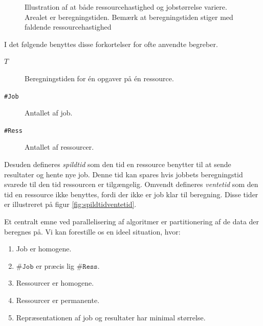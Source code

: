 \documentclass[final,a4paper,11pt]{article}
\begin{document}
\begin{figure}[!h]
\begin{center}

\caption{Illustration af at både ressourcehastighed og jobstørrelse variere. Arealet er beregningstiden. Bemærk at beregningstiden stiger med faldende ressourcehastighed}\label{fig:lillekassestorkasse} 
\end{center}
\end{figure}


I det følgende benyttes disse forkortelser for ofte anvendte begreber.
\begin{description}
	\item[$T$] Beregningstiden for én opgaver på én ressource.  
	\item[\texttt{\#Job}] Antallet af job.
	\item[\texttt{\#Ress}] Antallet af ressourcer.  
\end{description}

Desuden defineres \emph{spildtid} som den tid en ressource benytter til at sende resultater og hente nye job. Denne tid kan spares hvis jobbets beregningstid svarede til den tid ressourcen er tilgængelig. Omvendt defineres \emph{ventetid} som den tid en ressource ikke benyttes, fordi der ikke er job klar til beregning. Disse tider er illustreret på figur \ref{fig:spildtidventetid}.

Et centralt emne ved parallelisering af algoritmer er partitionering af de data der beregnes på. Vi kan forestille os en ideel situation, hvor:
\begin{enumerate}
	\item Job er homogene. \label{beregningstid}
	\item $\texttt{\#Job}$ er præcis lig $\texttt{\#Ress}$.\label{antal}
	\item Ressourcer er homogene. 
	\item Ressourcer er permanente.
	\item Repræsentationen af job og resultater har minimal størrelse.\label{jobbeskrivelse}
\end{enumerate}
\end{document}
